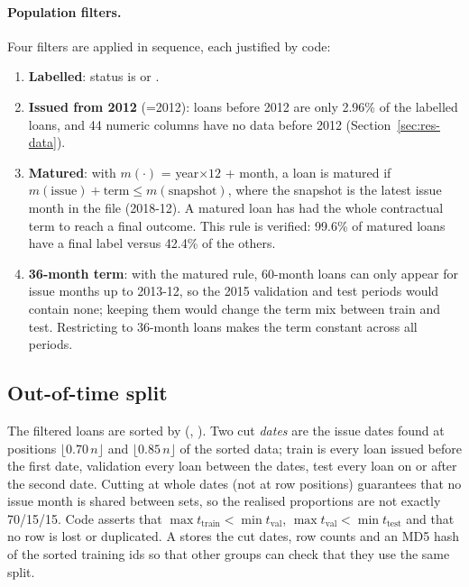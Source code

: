 \paragraph{Population filters.} Four filters are applied in sequence, each justified by code:
\begin{enumerate}
    \item \textbf{Labelled}: status is  or .
    \item \textbf{Issued from 2012} (=2012): loans before 2012 are only 2.96\% of the labelled loans, and 44 numeric columns have no data before 2012 (Section~\ref{sec:res-data}).
    \item \textbf{Matured}: with $m(\cdot)$ = year$\times 12$ + month, a loan is matured if $m(\text{issue})+\text{term}\le m(\text{snapshot})$, where the snapshot is the latest issue month in the file (2018-12). A matured loan has had the whole contractual term to reach a final outcome. This rule is verified: 99.6\% of matured loans have a final label versus 42.4\% of the others.
    \item \textbf{36-month term}: with the matured rule, 60-month loans can only appear for issue months up to 2013-12, so the 2015 validation and test periods would contain none; keeping them would change the term mix between train and test. Restricting to 36-month loans makes the term constant across all periods.
\end{enumerate}

\subsection{Out-of-time split}
\label{sec:split}

The filtered loans are sorted by (, ). Two cut \emph{dates} are the issue dates found at positions $\lfloor 0.70\,n\rfloor$ and $\lfloor 0.85\,n\rfloor$ of the sorted data; train is every loan issued before the first date, validation every loan between the dates, test every loan on or after the second date. Cutting at whole dates (not at row positions) guarantees that no issue month is shared between sets, so the realised proportions are not exactly 70/15/15. Code asserts that $\max t_{\text{train}}<\min t_{\text{val}}$, $\max t_{\text{val}}<\min t_{\text{test}}$ and that no row is lost or duplicated. A  stores the cut dates, row counts and an MD5 hash of the sorted training ids so that other groups can check that they use the same split.

